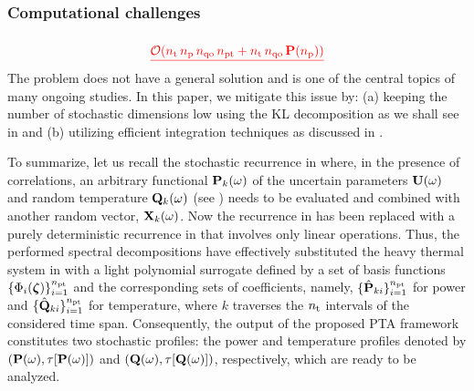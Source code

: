 \subsubsection{Computational challenges} 
$ $
\[
  \updated{\O(\nsteps \, \nprocs \, \qdorder \, \pcterms + \nsteps \, \qdorder \, \vP(\nprocs))}
\]
The problem does not have a general solution and is one of the central topics of many ongoing studies.
In this paper, we mitigate this issue by: (a) keeping the number of stochastic dimensions low using the KL decomposition as we shall see in  and (b) utilizing efficient integration techniques as discussed in .

To summarize, let us recall the stochastic recurrence in  where, in the presence of correlations, an arbitrary functional $\mathbf{P}_k(\omega)$ of the uncertain parameters $\mathbf{U}(\omega)$ and random temperature $\mathbf{Q}_k(\omega)$ (see ) needs to be evaluated and combined with another random vector, $\mathbf{X}_k(\omega)$.
Now the recurrence in  has been replaced with a purely deterministic recurrence in  that involves only linear operations.
Thus, the performed spectral decompositions have effectively substituted the heavy thermal system in  with a light polynomial surrogate defined by a set of basis functions $\{ \Phi_i(\boldsymbol{\zeta}) \}_{i = 1}^{n_\text{pt}}$ and the corresponding sets of coefficients, namely, $\{ \hat{\mathbf{P}}_{ki} \}_{i = 1}^{n_\text{pt}}$ for power and $\{ \hat{\mathbf{Q}}_{ki} \}_{i = 1}^{n_\text{pt}}$ for temperature, where $k$ traverses the ${n_\text{t}}$ intervals of the considered time span.
Consequently, the output of the proposed PTA framework constitutes two stochastic profiles: the power and temperature profiles denoted by $\profileP{\o}$ and $\profileT{\o}$, respectively, which are ready to be analyzed.

